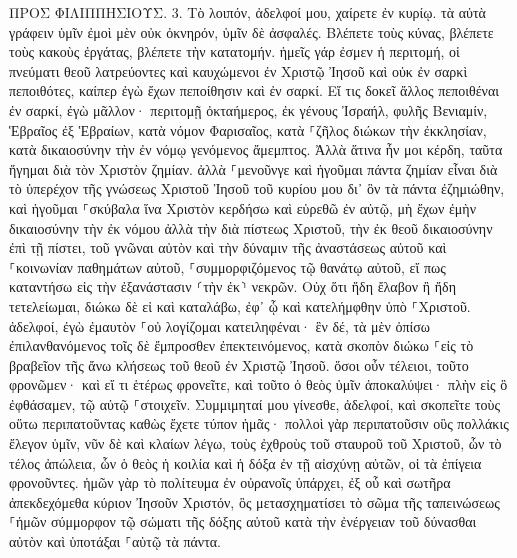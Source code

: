 \documentclass[twoside, 9pt]{extreport}
\begin{document}
ΠΡΟΣ ΦΙΛΙΠΠΗΣΙΟΥΣ.
3.
Τὸ λοιπόν, ἀδελφοί μου, χαίρετε ἐν κυρίῳ. τὰ αὐτὰ γράφειν ὑμῖν ἐμοὶ μὲν οὐκ ὀκνηρόν, ὑμῖν δὲ ἀσφαλές. 
Βλέπετε τοὺς κύνας, βλέπετε τοὺς κακοὺς ἐργάτας, βλέπετε τὴν κατατομήν. 
ἡμεῖς γάρ ἐσμεν ἡ περιτομή, οἱ πνεύματι θεοῦ λατρεύοντες καὶ καυχώμενοι ἐν Χριστῷ Ἰησοῦ καὶ οὐκ ἐν σαρκὶ πεποιθότες, 
καίπερ ἐγὼ ἔχων πεποίθησιν καὶ ἐν σαρκί. Εἴ τις δοκεῖ ἄλλος πεποιθέναι ἐν σαρκί, ἐγὼ μᾶλλον· 
περιτομῇ ὀκταήμερος, ἐκ γένους Ἰσραήλ, φυλῆς Βενιαμίν, Ἑβραῖος ἐξ Ἑβραίων, κατὰ νόμον Φαρισαῖος, 
κατὰ ⸀ζῆλος διώκων τὴν ἐκκλησίαν, κατὰ δικαιοσύνην τὴν ἐν νόμῳ γενόμενος ἄμεμπτος. 
Ἀλλὰ ἅτινα ἦν μοι κέρδη, ταῦτα ἥγημαι διὰ τὸν Χριστὸν ζημίαν. 
ἀλλὰ ⸀μενοῦνγε καὶ ἡγοῦμαι πάντα ζημίαν εἶναι διὰ τὸ ὑπερέχον τῆς γνώσεως Χριστοῦ Ἰησοῦ τοῦ κυρίου μου δι᾽ ὃν τὰ πάντα ἐζημιώθην, καὶ ἡγοῦμαι ⸀σκύβαλα ἵνα Χριστὸν κερδήσω 
καὶ εὑρεθῶ ἐν αὐτῷ, μὴ ἔχων ἐμὴν δικαιοσύνην τὴν ἐκ νόμου ἀλλὰ τὴν διὰ πίστεως Χριστοῦ, τὴν ἐκ θεοῦ δικαιοσύνην ἐπὶ τῇ πίστει, 
τοῦ γνῶναι αὐτὸν καὶ τὴν δύναμιν τῆς ἀναστάσεως αὐτοῦ καὶ ⸀κοινωνίαν παθημάτων αὐτοῦ, ⸀συμμορφιζόμενος τῷ θανάτῳ αὐτοῦ, 
εἴ πως καταντήσω εἰς τὴν ἐξανάστασιν ⸂τὴν ἐκ⸃ νεκρῶν. 
Οὐχ ὅτι ἤδη ἔλαβον ἢ ἤδη τετελείωμαι, διώκω δὲ εἰ καὶ καταλάβω, ἐφ᾽ ᾧ καὶ κατελήμφθην ὑπὸ ⸀Χριστοῦ. 
ἀδελφοί, ἐγὼ ἐμαυτὸν ⸀οὐ λογίζομαι κατειληφέναι· ἓν δέ, τὰ μὲν ὀπίσω ἐπιλανθανόμενος τοῖς δὲ ἔμπροσθεν ἐπεκτεινόμενος, 
κατὰ σκοπὸν διώκω ⸀εἰς τὸ βραβεῖον τῆς ἄνω κλήσεως τοῦ θεοῦ ἐν Χριστῷ Ἰησοῦ. 
ὅσοι οὖν τέλειοι, τοῦτο φρονῶμεν· καὶ εἴ τι ἑτέρως φρονεῖτε, καὶ τοῦτο ὁ θεὸς ὑμῖν ἀποκαλύψει· 
πλὴν εἰς ὃ ἐφθάσαμεν, τῷ αὐτῷ ⸀στοιχεῖν. 
Συμμιμηταί μου γίνεσθε, ἀδελφοί, καὶ σκοπεῖτε τοὺς οὕτω περιπατοῦντας καθὼς ἔχετε τύπον ἡμᾶς· 
πολλοὶ γὰρ περιπατοῦσιν οὓς πολλάκις ἔλεγον ὑμῖν, νῦν δὲ καὶ κλαίων λέγω, τοὺς ἐχθροὺς τοῦ σταυροῦ τοῦ Χριστοῦ, 
ὧν τὸ τέλος ἀπώλεια, ὧν ὁ θεὸς ἡ κοιλία καὶ ἡ δόξα ἐν τῇ αἰσχύνῃ αὐτῶν, οἱ τὰ ἐπίγεια φρονοῦντες. 
ἡμῶν γὰρ τὸ πολίτευμα ἐν οὐρανοῖς ὑπάρχει, ἐξ οὗ καὶ σωτῆρα ἀπεκδεχόμεθα κύριον Ἰησοῦν Χριστόν, 
ὃς μετασχηματίσει τὸ σῶμα τῆς ταπεινώσεως ⸀ἡμῶν σύμμορφον τῷ σώματι τῆς δόξης αὐτοῦ κατὰ τὴν ἐνέργειαν τοῦ δύνασθαι αὐτὸν καὶ ὑποτάξαι ⸀αὑτῷ τὰ πάντα. 
\end{document}

